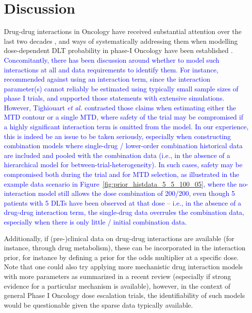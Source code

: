 \documentclass[AMA,STIX1COL]{WileyNJD-v2}
\newcommand{\revision}[1]{\textcolor{blue}{#1}}
\begin{document}
\section{Discussion}\label{sec:discussion}
Drug-drug interactions in Oncology have received substantial attention over the last two decades \cite{Beijnen2004}, and ways of systematically addressing them when modelling dose-dependent DLT probability in phase-I Oncology have been established \cite{Thall2003}. \revision{Concomitantly, there has been discussion around whether to model such interactions at all and data requirements to identify them. For instance, \cite{Wang2005, Riviere2015} recommended against using an interaction term, since the interaction parameter(s) cannot reliably be estimated using typically small sample sizes of phase I trials, and \cite{Mozgunov2021} supported those statements with extensive simulations. However, Tighiouart \emph{et al.}\cite{Tighiouart2022} contrasted those claims when estimating either the MTD contour or a single MTD, where safety of the trial may be compromised if a highly significant interaction term is omitted from the model. In our experience, this is indeed be an issue to be taken seriously, especially when constructing combination models where single-drug / lower-order combination historical data are included and pooled with the combination data (i.e., in the absence of a hierarchical model for between-trial-heterogeneity). In such cases, safety may be compromised both during the trial and for MTD selection, as illustrated in the example data scenario in Figure~\ref{fig:prior_histdata_5_5_100_05}, where the no-interaction model still allows the dose combination of 200/200, even though 5 patients with 5 DLTs have been observed at that dose -- i.e., in the absence of a drug-drug interaction term, the single-drug data overrules the combination data, especially when there is only little / initial combination data.} 

Additionally, if (pre-)clinical data on drug-drug interactions are available (for instance, through drug metabolism), these can be incorporated in the interaction prior, for instance by defining a prior for the odds multiplier at a specific dose. Note that one could also try applying more mechanistic drug interaction models with more parameters as summarized in a recent review\cite{Meyer2020} (especially if strong evidence for a particular mechanism is available), however, in the context of general Phase I Oncology dose escalation trials, the identifiability of such models would be questionable given the sparse data typically available.
\end{document}
